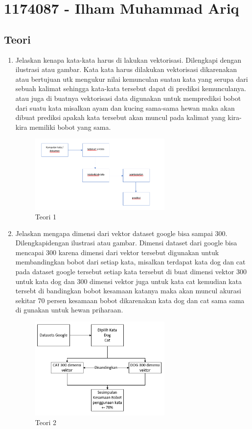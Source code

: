 \section{1174087 - Ilham Muhammad Ariq}
\subsection{Teori}
\begin{enumerate}
	\item Jelaskan kenapa kata-kata harus di lakukan vektorisasi. Dilengkapi dengan ilustrasi atau gambar.
	\hfill\break
	Kata kata harus dilakukan vektorisasi dikarenakan atau bertujuan utk mengukur nilai kemunculan suatau kata yang serupa dari sebuah kalimat sehingga kata-kata tersebut dapat di prediksi kemunculanya. atau juga di buatnya vektorisasi data digunakan untuk memprediksi bobot dari suatu kata misalkan ayam dan kucing sama-sama hewan maka akan dibuat prediksi apakah kata tersebut akan muncul pada kalimat yang kira-kira memiliki bobot yang sama.
	\hfill\break
	\begin{figure}[H]
		\includegraphics[width=7cm]{figures/1174087/5/1.png}
		\centering
		\caption{Teori 1}
	\end{figure}

	\item Jelaskan mengapa dimensi dari vektor dataset google bisa sampai 300. Dilengkapidengan ilustrasi atau gambar.
	\hfill\break
	Dimensi dataset dari google bisa mencapai 300 karena dimensi dari vektor tersebut digunakan untuk membandingkan bobot dari setiap kata, misalkan terdapat kata dog dan cat pada dataset google tersebut setiap kata tersebut di buat dimensi vektor 300 untuk kata dog dan 300 dimensi vektor juga untuk kata cat kemudian kata tersebt di bandingkan bobot kesamaan katanya maka akan muncul akurasi sekitar 70 persen kesamaan bobot dikarenakan kata dog dan cat sama sama di gunakan untuk hewan priharaan.
	\hfill\break
	\begin{figure}[H]
		\includegraphics[width=7cm]{figures/1174087/5/2.png}
		\centering
		\caption{Teori 2}
	\end{figure}


\end{enumerate}
